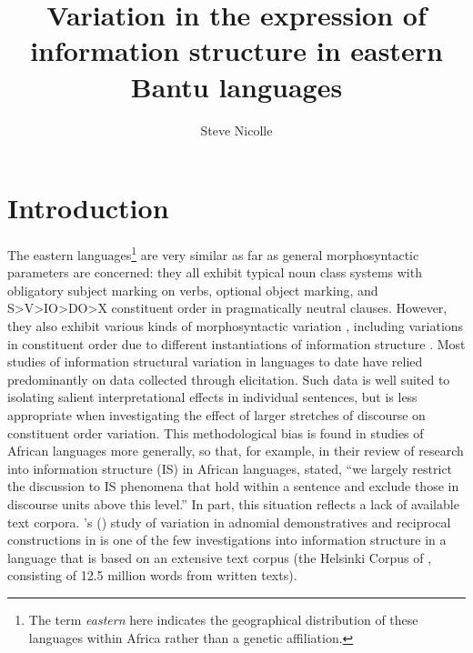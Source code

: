 \documentclass[output=paper]{langsci/langscibook}
\title{Variation in the expression of information structure in eastern {Bantu} languages}
\author{%
Steve Nicolle\affiliation{Canada Institute of Linguistics / SIL International} 
}
\begin{document}
 


\section{Introduction}\label{§1:introduction.nicolle}

The eastern  languages\footnote{The term \textit{eastern} here indicates the geographical distribution of these languages within Africa rather than a genetic affiliation.} are very similar as far as general morphosyntactic parameters are concerned: they all exhibit typical  noun class systems with obligatory subject marking on verbs, optional object marking, and S>V>IO>DO>X constituent order in pragmatically neutral clauses. However, they also exhibit various kinds of morphosyntactic variation \citep{martenetal2007,vanderwalbiberauer2014}, including variations in constituent order due to different instantiations of information structure \citep{zerbian2006,buelletal2011,yoneda2011,downinghyman2016}. Most studies of information structural variation in  languages to date have relied predominantly on data collected through elicitation. Such data is well suited to isolating salient interpretational effects in individual sentences, but is less appropriate when investigating the effect of larger stretches of discourse on constituent order variation. This methodological bias is found in studies of African languages more generally, so that, for example, \citet[157]{gueldemannetal2015} in their review of research into information structure (IS) in African languages, stated, “we largely restrict the discussion to IS phenomena that hold within a sentence and exclude those in discourse units above this level.” In part, this situation reflects a lack of available text corpora. \citeauthor{mwamzandi2014}’s (\citeyear{mwamzandi2014}) study of variation in adnomial demonstratives and reciprocal constructions in  is one of the few investigations into information structure in a  language that is based on an extensive text corpus (the Helsinki Corpus of , consisting of 12.5 million words from written  texts).
\end{document}
